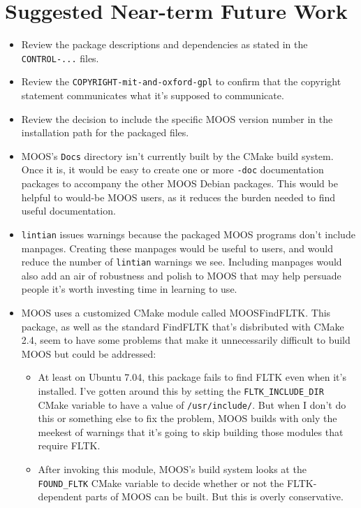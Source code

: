 \documentclass[letterpaper,10pt]{article}
\begin{document}
\section{Suggested Near-term Future Work}
\begin{itemize}
 \item Review the package descriptions and dependencies as stated in the
	\verb|CONTROL-...| files.

 \item Review the \verb|COPYRIGHT-mit-and-oxford-gpl| to confirm that the
	copyright statement communicates what it's supposed to communicate.

 \item Review the decision to include the specific MOOS version number in
	the installation path for the packaged files.

 \item MOOS's \verb|Docs| directory isn't currently built by the CMake
	build system.  Once it is, it would be easy to create one or
	more \verb|-doc| documentation packages to accompany the other
	MOOS Debian packages.  This would be helpful to would-be MOOS
	users, as it reduces the burden needed to find useful documentation.
 
 \item \verb|lintian| issues warnings because the packaged MOOS programs don't
	include manpages.  Creating these manpages would be useful to users,
	and would reduce the number of \verb|lintian| warnings we see.  
	Including manpages would also add an air of robustness and polish
	to MOOS that may help persuade people it's worth investing time in
	learning to use.

 \item MOOS uses a customized CMake module called MOOSFindFLTK.  This package,
	as well as the standard FindFLTK that's disbributed with CMake 2.4,
	seem to have some problems that make it unnecessarily difficult
	to build MOOS but could be addressed:

	\begin{itemize}
	 \item At least on Ubuntu 7.04, this package fails to find FLTK even
		when it's installed.  I've gotten around this by setting the
		\verb|FLTK_INCLUDE_DIR| CMake variable to have a value of
		\verb|/usr/include/|.  But when I don't do this or something
		else to fix the problem, MOOS builds with only the meekest of
		warnings that it's going to skip building those modules that
		require FLTK.

	 \item After invoking this module, MOOS's build system looks at the
		\verb|FOUND_FLTK| CMake variable to decide whether or not the
		FLTK-dependent parts of MOOS can be built.  But this is overly
		conservative.


\end{itemize}
\end{itemize}
\end{document}
